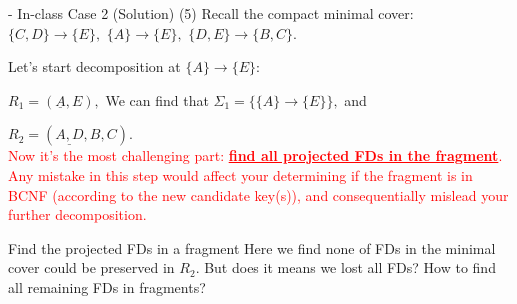 \begin{frame}[fragile]{ - In-class Case 2 (Solution)}
	(5) Recall the compact minimal cover:\\
	
	$\{C,D\} \rightarrow \{E\},$
	$\{A\}  \rightarrow \{E\},$
	$\{D,E\} \rightarrow \{B,C\}.$\\\vspace{2pt}
	
	Let's start decomposition at $\{A\} \rightarrow \{E\}$:\\\vspace{2pt}
		
	$R_1 = (\underline{A}, E),$
	We can find that 
	$\Sigma_1 = \{\{A\}\rightarrow\{E\}\},$ and\\\vspace{2pt}
	
	$R_2 = (\underline{A,D}, B, C).$ \\
	{\scriptsize\textcolor{red}{Now it's the most challenging part: \textbf{\underline{find all projected FDs in the fragment}}. Any mistake in this step would affect your determining if the fragment is in BCNF (according to the new candidate key(s)), and consequentially mislead your further decomposition.}}\\
	
	\begin{alertblock}{Find the projected FDs in a fragment}
	Here we find none of FDs in the minimal cover could be preserved in $R_2$. But does it means we lost all FDs? How to find all remaining FDs in fragments?\\
	\end{alertblock}

\end{frame}

